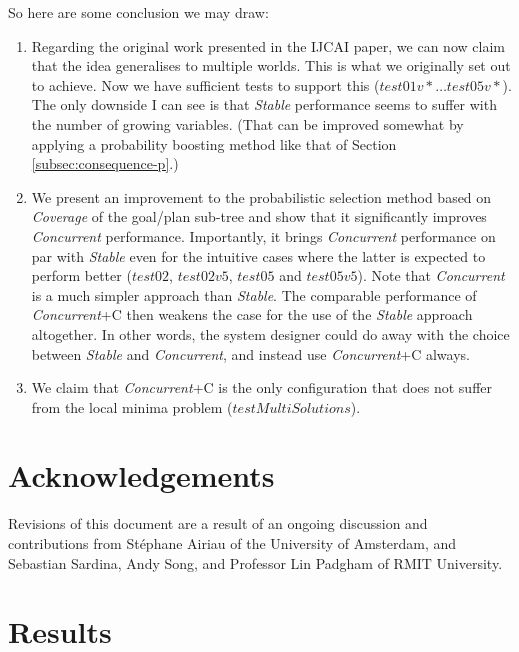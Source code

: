 \documentclass[a4paper]{article}
\newcommand{\cc}{\emph{Concurrent}\xspace}
\newcommand{\st}{\emph{Stable}\xspace}
\newcommand{\cov}{\emph{Coverage}\xspace}
\newcommand{\stephane}{{St\'ephane}\xspace}
\begin{document}
So here are some conclusion we may draw:
\begin{enumerate}
\item Regarding the original work presented in the IJCAI paper, we can now claim that the idea generalises to multiple worlds. This is what we originally set out to achieve. Now we have sufficient tests to support this ($test01v* \ldots test05v*$). The only downside I can see is that \st performance seems to suffer with the number of growing variables. (That can be improved somewhat by applying a probability boosting method like that of Section \ref{subsec:consequence-p}.)
\item We present an improvement to the probabilistic selection method based on \cov of the goal/plan sub-tree and show that it significantly improves \cc performance. Importantly, it brings \cc performance on par with \st even for the intuitive cases where the latter is expected to perform better ($test02$, $test02v5$, $test05$ and $test05v5$). Note that \cc is a much simpler approach than \st. The comparable performance of {\cc}+C then weakens the case for the use of the \st approach altogether. In other words, the system designer could do away with the choice between \st and \cc, and instead use {\cc}+C always.
\item We claim that {\cc}+C is the only configuration that does not suffer from the local minima problem ($testMultiSolutions$).
\end{enumerate}


\section{Acknowledgements}

Revisions of this document are a result of an ongoing discussion and contributions from \stephane Airiau of the University of Amsterdam, and Sebastian Sardina, Andy Song, and Professor Lin Padgham of RMIT University.


 


\appendix

\section{Results}
\label{sec:results}






\end{document}
